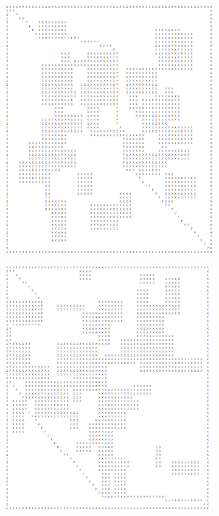 \documentclass{article}
\begin{document}
\begin{figure}[h]
    \centering
    \begin{subfigure}[b]{0.49\textwidth}
        \centering
        \includegraphics[width=\textwidth]{figures/map_1.png}
    \end{subfigure}
    \begin{subfigure}[b]{0.49\textwidth}
        \centering
        \includegraphics[width=\textwidth]{figures/map_2.png}

\end{subfigure}
\end{figure}
\end{document}
